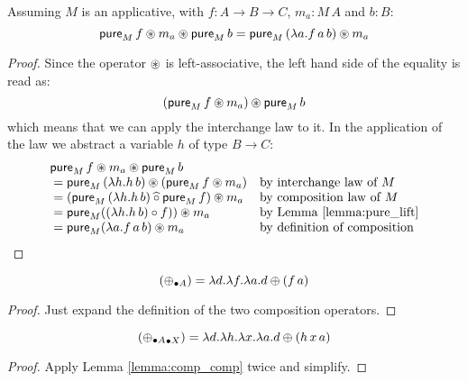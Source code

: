 
\begin{lemmaa}{11}\label{lemma:applicative_flip}
Assuming $M$ is an applicative, with $f : A \rightarrow B \rightarrow C$, $m_a : M\, A$ and $b : B$:
$$
\mathsf{pure}_M\, f \circledast m_a \circledast \mathsf{pure}_M\, b = \mathsf{pure}_M\, (\lambda a . f\, a\, b) \circledast m_a
$$
\end{lemmaa}
\begin{proof}
Since the operator $\circledast$ is left-associative, the left hand side of the equality is read as:
$$
(\mathsf{pure}_M\, f \circledast m_a) \circledast \mathsf{pure}_M\, b
$$
which means that we can apply the interchange law to it.
In the application of the law we abstract a variable $h$ of type $B\rightarrow C$:
$$
\begin{array}{ll}
\mathsf{pure}_M\, f \circledast m_a \circledast \mathsf{pure}_M\, b \\
{} =  \mathsf{pure}_M\, (\lambda h. h\, b) \circledast (\mathsf{pure}_M\, f \circledast m_a)
 & \mbox{by interchange law of }M\\
{} =  (\mathsf{pure}_M\, (\lambda h. h\, b) \mathbin{\widehat{\circ}} \mathsf{pure}_M\, f) \circledast m_a
 & \mbox{by composition law of }M\\
{} =  \mathsf{pure}_M ( (\lambda h. h\, b) \circ f ) ) \circledast m_a
 & \mbox{by Lemma \ref{lemma:pure_lift}}\\
{} =  \mathsf{pure}_M (\lambda a. f\, a\, b ) \circledast m_a
 & \mbox{by definition of composition}\\
\end{array}
$$
\end{proof}


\begin{lemmaa}{13}\label{lemma:comp_comp}
$$
(\mathbin{\oplus_{\bullet A}}) = \lambda d.\lambda f. \lambda a. d\oplus (f\,a)
$$
\end{lemmaa}
\begin{proof}
Just expand the definition of the two composition operators.
\end{proof}

\begin{lemmaa}{14}\label{lemma:comp_comp_comp}
$$
(\mathbin{\mathbin{\oplus_{\bullet A}}_{\bullet X}}) =
\lambda d. \lambda h. \lambda x.\lambda a. d\oplus (h\,x\,a)
$$
\end{lemmaa}
\begin{proof}
Apply Lemma \ref{lemma:comp_comp} twice and simplify.
\end{proof}


